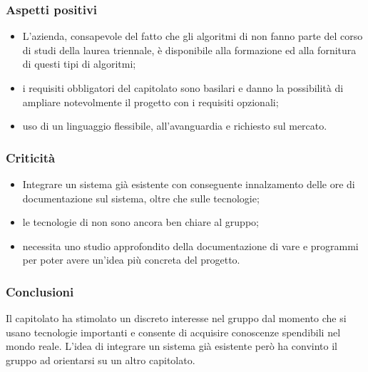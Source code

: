 		\subsubsection{Aspetti positivi}
			\begin{itemize}
			  \item L’azienda, consapevole del fatto che gli algoritmi di  non fanno parte del corso di studi della laurea triennale, è disponibile alla formazione ed alla fornitura di questi tipi di algoritmi;
			  \item i requisiti obbligatori del capitolato sono basilari e danno la possibilità di ampliare notevolmente il progetto con i requisiti opzionali;
			  \item uso di un linguaggio flessibile, all'avanguardia e richiesto sul mercato.
			\end{itemize}

		\subsubsection{Criticità}
			\begin{itemize}
				\item Integrare un sistema già esistente con conseguente innalzamento delle ore di documentazione sul sistema, oltre che sulle tecnologie;
				\item le tecnologie di  non sono ancora ben chiare al gruppo;
				\item necessita uno studio approfondito della documentazione di vare  e programmi per poter avere un'idea più concreta del progetto.
			\end{itemize}

		\subsubsection{Conclusioni}
			Il capitolato ha stimolato un discreto interesse nel gruppo dal momento che si usano tecnologie importanti e consente di acquisire conoscenze spendibili nel mondo reale. L'idea di integrare un sistema già esistente però ha convinto il gruppo ad orientarsi su un altro capitolato.

